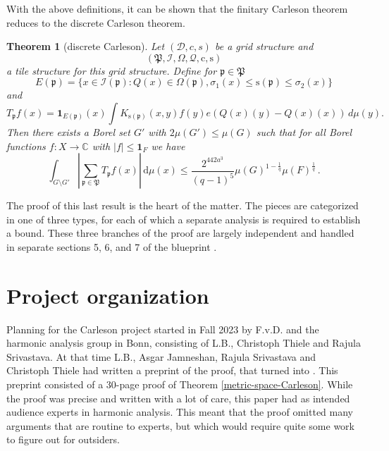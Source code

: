 \documentclass[12pt]{amsart}
\theoremstyle{definition}
\theoremstyle{plain}
\newtheorem{theorem}{Theorem}[subsection]
\def\C{\mathbb{C}}
\newcommand{\pc}{{\mathrm{c}}}
\newcommand{\ps}{{\mathrm{s}}}
\newcommand{\fc}{{\Omega}}
\newcommand{\scI}{{\mathcal{I}}} %
\newcommand{\tQ}{{Q}}
\newcommand{\fcc}{{\mathcal{Q}}}
\newcommand{\fp}{{\mathfrak p}}
\newcommand{\fP}{{\mathfrak P}}
\begin{document}
With the above definitions, it can be shown that the finitary Carleson theorem reduces to the discrete Carleson theorem.

\begin{theorem}[discrete Carleson]
\label{discrete-Carleson}
Let $(\mathcal{D}, c, s)$ be a grid structure and
\begin{equation*}
    (\fP,\scI,\fc,\fcc,\pc,\ps)
\end{equation*}
a tile structure for this grid structure.
Define for $\fp\in \fP$
\begin{equation}\label{defineep}
    E(\fp)=\{x\in \scI(\fp): \tQ(x)\in \fc(\fp) , {\sigma_1}(x)\le \ps(\fp)\le {\sigma_2}(x)\}
\end{equation}
and
\begin{equation}\label{definetp}
    T_{\fp} f(x)= \mathbf{1}_{E(\fp)}(x) \int K_{\ps(\fp)}(x,y) f(y) e(\tQ(x)(y)-\tQ(x)(x))\, d\mu(y).
\end{equation}
Then there exists a Borel set $G'$ with $2\mu(G') \leq \mu(G)$ such that for all Borel functions $f:X\to \C$ with $|f|\le \mathbf{1}_F$
we have
\begin{equation}
    \label{disclesssim}
   \int_{G \setminus G'} \left| \sum_{\fp \in \fP} T_{\fp} f (x) \right| \, \mathrm{d}\mu(x) \le \frac{2^{442a^3}}{(q-1)^5} \mu(G)^{1-\frac{1}{q}} \mu(F)^{\frac{1}{q}}\,.
\end{equation}
\end{theorem}

The proof of this last result is the heart of the matter.
The pieces are categorized in one of three types, for each of which a separate analysis is required to establish a bound.
These three branches of the proof are largely independent and handled in separate sections 5, 6, and 7 of the blueprint \cite{CarlesonBlueprint}.

\section{Project organization}\label{sec:org}

Planning for the Carleson project started in Fall 2023 by
F.v.D. and the harmonic analysis group in Bonn,
consisting of L.B., Christoph Thiele and Rajula Srivastava.
At that time L.B., Asgar Jamneshan, Rajula Srivastava and Christoph Thiele had written a preprint of the proof,
that turned into \cite{ThieleCarlesonPreprint}.
This preprint consisted of a 30-page proof of Theorem \ref{metric-space-Carleson}. %
While the proof was precise and written with a lot of care,
this paper had as intended audience experts in harmonic analysis.
This meant that the proof omitted many arguments that are routine to experts,
but which would require quite some work to figure out for outsiders.
\end{document}
